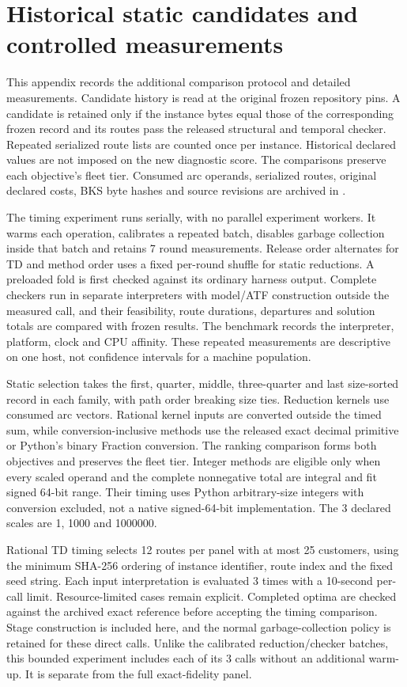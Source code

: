 \section{Historical static candidates and controlled measurements}\label{app:controlled}

This appendix records the additional comparison protocol and detailed measurements. Candidate history is read at the original frozen repository pins. A candidate is retained only if the instance bytes equal those of the corresponding frozen record and its routes pass the released structural and temporal checker. Repeated serialized route lists are counted once per instance. Historical declared values are not imposed on the new diagnostic score. The comparisons preserve each objective's fleet tier. Consumed arc operands, serialized routes, original declared costs, BKS byte hashes and source revisions are archived in .

The timing experiment runs serially, with no parallel experiment workers. It warms each operation, calibrates a repeated batch, disables garbage collection inside that batch and retains 7 round measurements. Release order alternates for TD and method order uses a fixed per-round shuffle for static reductions. A preloaded fold is first checked against its ordinary harness output. Complete checkers run in separate interpreters with model/ATF construction outside the measured call, and their feasibility, route durations, departures and solution totals are compared with frozen results. The benchmark records the interpreter, platform, clock and CPU affinity. These repeated measurements are descriptive on one host, not confidence intervals for a machine population.

Static selection takes the first, quarter, middle, three-quarter and last size-sorted record in each family, with path order breaking size ties. Reduction kernels use consumed arc vectors. Rational kernel inputs are converted outside the timed sum, while conversion-inclusive methods use the released exact decimal primitive or Python's binary Fraction conversion. The ranking comparison forms both objectives and preserves the fleet tier. Integer methods are eligible only when every scaled operand and the complete nonnegative total are integral and fit signed 64-bit range. Their timing uses Python arbitrary-size integers with conversion excluded, not a native signed-64-bit implementation. The 3 declared scales are 1, 1000 and 1000000.

Rational TD timing selects 12 routes per panel with at most 25 customers, using the minimum SHA-256 ordering of instance identifier, route index and the fixed seed string. Each input interpretation is evaluated 3 times with a 10-second per-call limit. Resource-limited cases remain explicit. Completed optima are checked against the archived exact reference before accepting the timing comparison. Stage construction is included here, and the normal garbage-collection policy is retained for these direct calls. Unlike the calibrated reduction/checker batches, this bounded experiment includes each of its 3 calls without an additional warm-up. It is separate from the full exact-fidelity panel.

